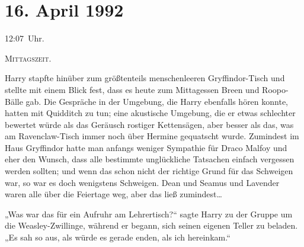 
\section{16. April 1992}

12:07~Uhr.

\lettrine{M}{ittagszeit.}

\hplettrineextrapara
Harry stapfte hinüber zum größtenteils menschenleeren Gryffindor-Tisch und stellte mit einem Blick fest, dass es heute zum Mittagessen Breen und Roopo-Bälle gab. Die Gespräche in der Umgebung, die Harry ebenfalls hören konnte, hatten mit Quidditch zu tun; eine akustische Umgebung, die er etwas schlechter bewertet würde als das Geräusch rostiger Kettensägen, aber besser als das, was am Ravenclaw-Tisch immer noch über Hermine gequatscht wurde. Zumindest im Haus Gryffindor hatte man anfangs weniger Sympathie für Draco Malfoy und eher den Wunsch, dass alle bestimmte unglückliche Tatsachen einfach vergessen werden sollten; und wenn das schon nicht der richtige Grund für das Schweigen war, so war es doch wenigstens Schweigen. Dean und Seamus und Lavender waren alle über die Feiertage weg, aber das ließ zumindest…

„Was war das für ein Aufruhr am Lehrertisch?“ sagte Harry zu der Gruppe um die Weasley-Zwillinge, während er begann, sich seinen eigenen Teller zu beladen. „Es sah so aus, als würde es gerade enden, als ich hereinkam.“

